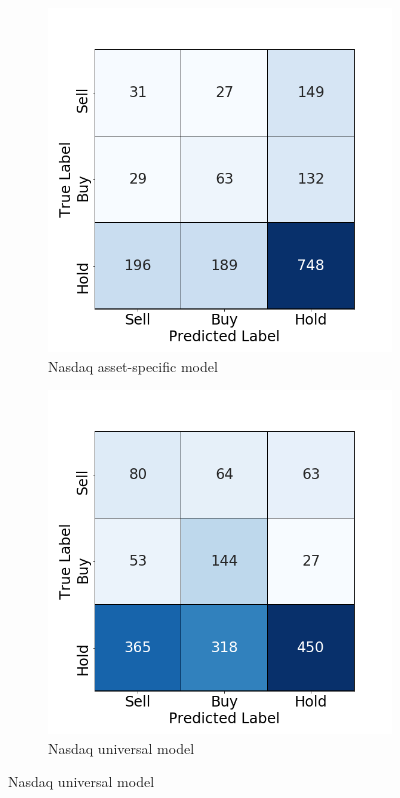 \documentclass[11pt, a4paper]{article}
\begin{document}
\begin{figure}[H]
\begin{subfigure}{.5\textwidth}
  \centering
  \includegraphics[width=.75\linewidth]{images/CMs/CM_indiv_IXIC.png}  
  \caption{Nasdaq asset-specific model}
  \label{fig:subIXICI}
\end{subfigure}
\begin{subfigure}{.5\textwidth}
  \centering
  \includegraphics[width=.75\linewidth]{images/CMs/CM_univ_IXIC.png}  
  \caption{Nasdaq universal model}
  \label{fig:subIXICU}
\end{subfigure}


\end{figure}
\end{document}
